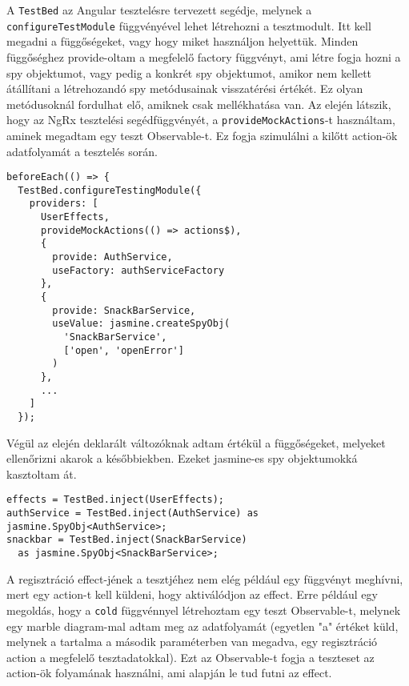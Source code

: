 \documentclass[a4paper,12pt]{report}
\begin{document}
A \verb|TestBed| az Angular tesztelésre tervezett segédje, melynek a \verb|configureTestModule| függvényével lehet létrehozni a tesztmodult. Itt kell megadni a függőségeket, vagy hogy miket használjon helyettük. Minden függőséghez provide-oltam a megfelelő factory függvényt, ami létre fogja hozni a spy objektumot, vagy pedig a konkrét spy objektumot, amikor nem kellett átállítani a létrehozandó spy metódusainak visszatérési értékét. Ez olyan metódusoknál fordulhat elő, amiknek csak mellékhatása van. Az elején látszik, hogy az NgRx tesztelési segédfüggvényét, a \verb|provideMockActions|-t használtam, aminek megadtam egy teszt Observable-t. Ez fogja szimulálni a kilőtt action-ök adatfolyamát a tesztelés során.

\begin{samepage}
    \begin{verbatim}
beforeEach(() => {
  TestBed.configureTestingModule({
    providers: [
      UserEffects,
      provideMockActions(() => actions$),
      {
        provide: AuthService,
        useFactory: authServiceFactory
      },
      {
        provide: SnackBarService,
        useValue: jasmine.createSpyObj(
          'SnackBarService',
          ['open', 'openError']
        )
      },
      ...
    ]
  });
    \end{verbatim}
\end{samepage}

Végül az elején deklarált változóknak adtam értékül a függőségeket, melyeket ellenőrizni akarok a későbbiekben. Ezeket jasmine-es spy objektumokká kasztoltam át.

\pagebreak
\begin{samepage}
    \begin{verbatim}
effects = TestBed.inject(UserEffects);
authService = TestBed.inject(AuthService) as jasmine.SpyObj<AuthService>;
snackbar = TestBed.inject(SnackBarService)
  as jasmine.SpyObj<SnackBarService>;
    \end{verbatim}
\end{samepage}

A regisztráció effect-jének a tesztjéhez nem elég például egy függvényt meghívni, mert egy action-t kell küldeni, hogy aktiválódjon az effect. Erre például egy megoldás, hogy a \verb|cold| függvénnyel létrehoztam egy teszt Observable-t, melynek egy marble diagram-mal adtam meg az adatfolyamát (egyetlen "a" értéket küld, melynek a tartalma a második paraméterben van megadva, egy regisztráció action a megfelelő tesztadatokkal). Ezt az Observable-t fogja a teszteset az action-ök folyamának használni, ami alapján le tud futni az effect.
\end{document}
